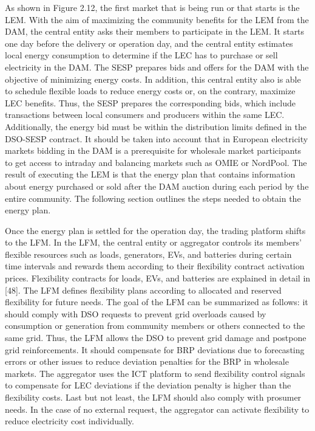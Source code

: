As shown in Figure 2.12, the first market that is being run or that starts is the LEM. With the aim of maximizing the community benefits for the LEM from the DAM, the central entity asks their members to participate in the LEM. It starts one day before the delivery or operation day, and the central entity estimates local energy consumption to determine if the LEC has to purchase or sell electricity in the DAM. The SESP prepares bids and offers for the DAM with the objective of minimizing energy costs. In addition, this central entity also is able to schedule flexible loads to reduce energy costs or, on the contrary, maximize LEC benefits.
Thus, the SESP prepares the corresponding bids, which include transactions between local consumers and producers within the same LEC.
Additionally, the energy bid must be within the distribution limits defined in the DSO-SESP contract. It should be taken into account that in European electricity markets bidding in the DAM is a prerequisite for wholesale market participants to get access to intraday and balancing markets such as OMIE or NordPool. The result of executing the LEM is that the energy plan that contains information about energy purchased or sold after the DAM auction during each period by the entire community. The following section outlines the steps needed to obtain the energy plan.

Once the energy plan is settled for the operation day, the trading platform shifts to the LFM. In the LFM, the central entity or aggregator controls its members' flexible resources such as loads, generators, EVs, and batteries during certain time intervals and rewards them according to their flexibility contract activation prices. Flexibility contracts for loads, EVs, and batteries are explained in detail in [48]. The LFM defines flexibility plans according to allocated and reserved flexibility for future needs. The goal of the LFM can be summarized as follows: it should comply with DSO requests to prevent grid overloads caused by consumption
or generation from community members or others connected to the same grid. Thus, the LFM allows the DSO to prevent grid damage and postpone grid reinforcements. It should compensate for BRP deviations due to forecasting errors or other issues to reduce deviation penalties for the BRP in wholesale markets. The aggregator uses the ICT platform to send flexibility control signals to compensate for LEC deviations if the deviation penalty is higher than the flexibility costs. Last but not least, the LFM should also comply with
prosumer needs. In the case of no external request, the aggregator can activate flexibility to reduce electricity cost individually.

